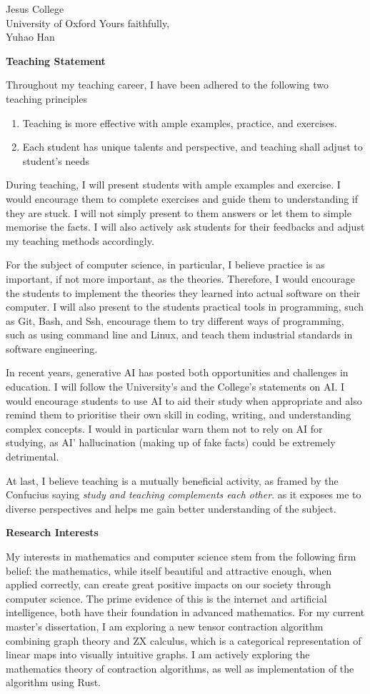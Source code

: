 \documentclass{letter}
\begin{document}
\begin{letter}{Jesus College \\ University of Oxford}
Yours faithfully,\\
Yuhao Han

\newpage

\textbf{Teaching Statement}

Throughout my teaching career, I have been adhered to the following two teaching principles
\begin{enumerate}
   \item Teaching is more effective with ample examples, practice, and exercises.
   \item Each student has unique talents and perspective, and teaching shall adjust to student's needs
\end{enumerate}
During teaching, I will present students with ample examples and exercise. I would encourage them to complete exercises and guide them to understanding if they are stuck.
I will not simply present to them answers or let them to simple memorise the facts.
I will also actively ask students for their feedbacks and adjust my teaching methods accordingly.

For the subject of computer science, in particular, I believe practice is as important, if not more important, as the theories.
Therefore, I would encourage the students to implement the theories they learned into actual software on their computer.
I will also present to the students practical tools in programming, such as Git, Bash, and Ssh, encourage them to try different ways of programming, such as using command line and Linux, and teach them industrial standards in software engineering.

In recent years, generative AI has posted both opportunities and challenges in education. 
I will follow the University's and the College's statements on AI.
I would encourage students to use AI to aid their study when appropriate and also remind them to prioritise their own skill in coding, writing, and understanding complex concepts.
I would in particular warn them not to rely on AI for studying, as AI' hallucination (making up of fake facts) could be extremely detrimental.

At last, I believe teaching is a mutually beneficial activity, as framed by the Confucius saying \textit{study and teaching complements each other}.
 as it exposes me to diverse perspectives and helps me gain better understanding of the subject.


\textbf{Research Interests}

My interests in mathematics and computer science stem from the following firm belief: the mathematics, while itself beautiful and attractive enough, when applied correctly, can create great positive impacts on our society through computer science.
The prime evidence of this is the internet and artificial intelligence, both  have their foundation in advanced mathematics.
For my current master's dissertation, I am exploring a new tensor contraction algorithm combining graph theory and ZX calculus, which is a categorical representation of linear maps into visually intuitive graphs.
I am actively exploring the mathematics theory of contraction algorithms, as well as implementation of the algorithm using Rust.


\end{letter}
\end{document}
